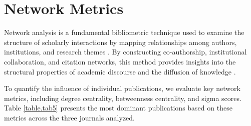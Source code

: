 \documentclass[twocolumn]{article}
\begin{document}
		
		
		
		
		
		\section{Network Metrics}
		
		Network analysis is a fundamental bibliometric technique used to examine the structure of scholarly interactions by mapping relationships among authors, institutions, and research themes \cite{Newman2001, Barabasi2002, Borgatti2009}. By constructing co-authorship, institutional collaboration, and citation networks, this method provides insights into the structural properties of academic discourse and the diffusion of knowledge \cite{Otte2002, Liu2005}.
		
		To quantify the influence of individual publications, we evaluate key network metrics, including degree centrality, betweenness centrality, and sigma scores. Table \ref{table.tab5} presents the most dominant publications based on these metrics across the three journals analyzed.
		
		
		
		
		
		
		
	
	
	
\end{document}
